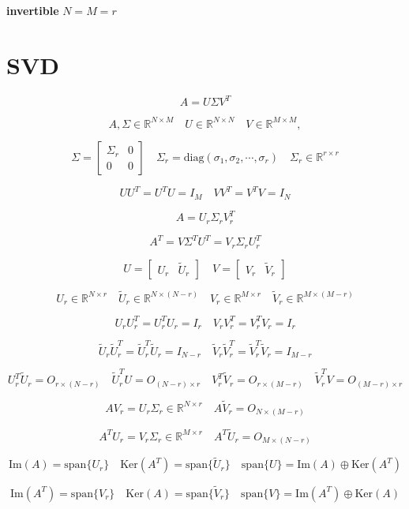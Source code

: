 \documentclass[12pt,a4paper]{article}
\begin{document}
\textbf{invertible}
$N=M=r$

\section{SVD}
\[
A = U\Sigma V^T
\]

\[
A, \Sigma \in \mathbb{R}^{N \times M} \quad U \in \mathbb{R}^{N \times N} \quad V \in \mathbb{R}^{M \times M}, 
\]

\[
	\Sigma = \left[ \begin{array}{cc}
	\Sigma_r & 0 \\ 0 & 0
	\end{array}\right]
\quad
\Sigma_r =\mathrm{ diag}(\sigma_1, \sigma_2, \cdots, \sigma_r) \quad \Sigma_r \in \mathbb{R}^{r \times r}
\]

\[
UU^T = U^TU = I_M \quad VV^T = V^TV = I_N
\]

\[
A = U_r \Sigma_r V_r^T
\]

\[
A^T = V\Sigma^TU^T = V_r\Sigma_rU_r^T
\]

\[
U = \left[\begin{array}{cc}U_r & \tilde{U}_r\end{array}\right] 
\quad
V = \left[\begin{array}{cc}V_r & \tilde{V}_r\end{array}\right] 
\]

\[
U_r \in \mathbb{R}^{N \times r} \quad \tilde{U}_r \in \mathbb{R}^{N \times (N-r)} \quad V_r \in \mathbb{R}^{M \times r} \quad \tilde{V}_r \in \mathbb{R}^{M \times (M-r)}
\]

\[
U_rU_r^T = U_r^TU_r = I_r \quad V_rV_r^T = V_r^T V_r = I_r
\]

\[
\tilde{U}_r\tilde{U}_r^T = \tilde{U}_r^T\tilde{U}_r = I_{N-r} \quad \tilde{V}_r\tilde{V}_r^T = \tilde{V}_r^T \tilde{V}_r = I_{M-r}
\]

\[
U_r^T\tilde{U}_r = O_{r\times(N-r)} \quad \tilde{U}_r^TU = O_{(N-r)\times r} \quad V_r^T\tilde{V}_r = O_{r\times(M-r)} \quad \tilde{V}_r^TV = O_{(M-r)\times r} 
\]

\[
AV_r = U_r\Sigma_r \in \mathbb{R}^{N \times r} \quad A\tilde{V}_r = O_{N\times(M-r)}
\]

\[
A^TU_r = V_r\Sigma_r \in \mathbb{R}^{M \times r} \quad A^T\tilde{U}_r = O_{M\times(N-r)}
\]

\[
\mathrm{Im}(A) = \mathrm{span}\{U_r\} \quad \mathrm{Ker}(A^T) = \mathrm{span}\{\tilde{U}_r\} \quad \mathrm{span}\{U\} = \mathrm{Im}(A) \oplus \mathrm{Ker}(A^T)
\]

\[
\mathrm{Im}(A^T) = \mathrm{span}\{V_r\} \quad \mathrm{Ker}(A) = \mathrm{span}\{\tilde{V}_r\} \quad \mathrm{span}\{V\} = \mathrm{Im}(A^T) \oplus \mathrm{Ker}(A)
\]
\end{document}
